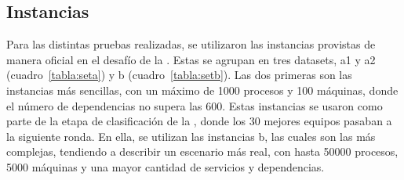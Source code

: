 \documentclass[../informe2.tex]{subfiles}
\begin{document}
\subsection{Instancias}
\label{sub:Instancias}
Para las distintas pruebas realizadas, se utilizaron las instancias provistas de manera oficial en el desafío de la \roadef. Estas se agrupan en tres datasets, a1 y a2 (cuadro~\ref{tabla:seta}) y b (cuadro~\ref{tabla:setb}). Las dos primeras son las instancias más sencillas, con un máximo de 1000 procesos y 100 máquinas, donde el número de dependencias no supera las 600. Estas instancias se usaron como parte de la etapa de clasificación de la \roadef, donde los 30 mejores equipos pasaban a la siguiente ronda. En ella, se utilizan las instancias b, las cuales son las más complejas, tendiendo a describir un escenario más real, con hasta 50000 procesos, 5000 máquinas y una mayor cantidad de servicios y dependencias.
\clearpage
\end{document}
